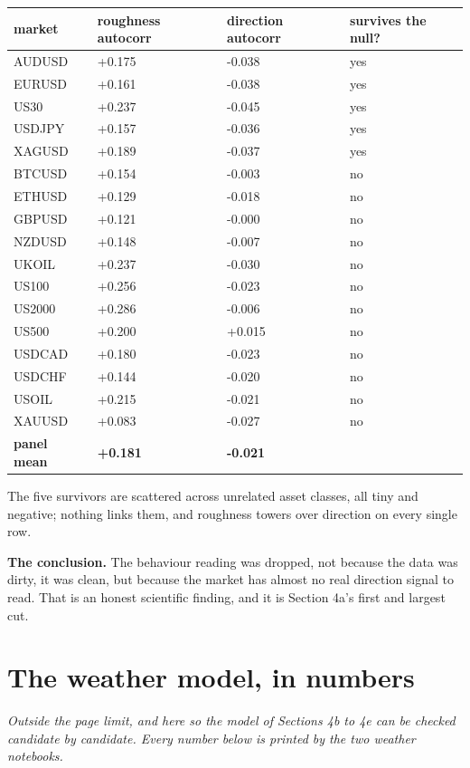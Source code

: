 \documentclass[11pt]{article} %
\begin{document}
\begin{center}
\begin{tabular}{llll}
\hline
market & roughness autocorr & direction autocorr & survives the null? \\
\hline
AUDUSD & +0.175 & -0.038 & yes \\
EURUSD & +0.161 & -0.038 & yes \\
US30 & +0.237 & -0.045 & yes \\
USDJPY & +0.157 & -0.036 & yes \\
XAGUSD & +0.189 & -0.037 & yes \\
BTCUSD & +0.154 & -0.003 & no \\
ETHUSD & +0.129 & -0.018 & no \\
GBPUSD & +0.121 & -0.000 & no \\
NZDUSD & +0.148 & -0.007 & no \\
UKOIL & +0.237 & -0.030 & no \\
US100 & +0.256 & -0.023 & no \\
US2000 & +0.286 & -0.006 & no \\
US500 & +0.200 & +0.015 & no \\
USDCAD & +0.180 & -0.023 & no \\
USDCHF & +0.144 & -0.020 & no \\
USOIL & +0.215 & -0.021 & no \\
XAUUSD & +0.083 & -0.027 & no \\
\textbf{panel mean} & \textbf{+0.181} & \textbf{-0.021} &  \\
\hline
\end{tabular}
\end{center}


The five survivors are scattered across unrelated asset classes, all tiny and negative; nothing links them, and roughness towers over direction on every single row.

\textbf{The conclusion.} The behaviour reading was dropped, not because the data was dirty, it was clean, but because the market has almost no real direction signal to read. That is an honest scientific finding, and it is Section 4a's first and largest cut.



\section{The weather model, in numbers}


\emph{Outside the page limit, and here so the model of Sections 4b to 4e can be checked candidate by candidate. Every number below is printed by the two weather notebooks.}
\end{document}
